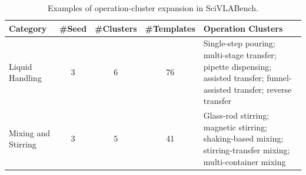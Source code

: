 \begin{table}[t]
  \centering
  \caption{Examples of operation-cluster expansion in SciVLABench.}
  \label{tab:cluster-expansion}
  \small
  \setlength{\tabcolsep}{5pt}
  \renewcommand{\arraystretch}{1.15}
  \begin{tabular}{p{2.8cm} c c c p{7.8cm}}
    \toprule
    \textbf{Category} & \textbf{\#Seed} & \textbf{\#Clusters} & \textbf{\#Templates} & \textbf{Operation Clusters} \\
    \midrule
    Liquid Handling
    & 3
    & 6
    & 76
    & Single-step pouring; multi-stage transfer; pipette dispensing; assisted transfer; funnel-assisted transfer; reverse transfer \\

    Mixing and Stirring
    & 3
    & 5
    & 41
    & Glass-rod stirring; magnetic stirring; shaking-based mixing; stirring-transfer mixing; multi-container mixing \\
    \bottomrule
  \end{tabular}
\end{table}
